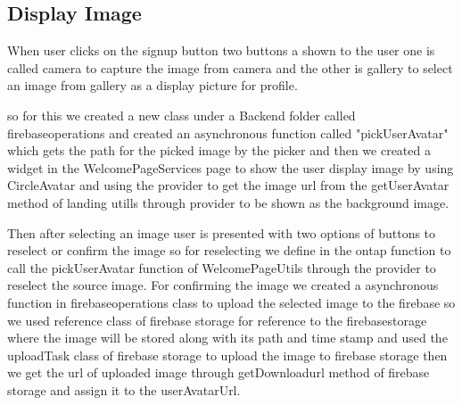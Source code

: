 \subsection{Display Image}
When user clicks on the signup button two buttons a shown to the user one is called camera to capture the image from camera and the other is gallery to select an image from gallery as a display picture for profile.

so for this we created a new class under a Backend folder called firebaseoperations and created an asynchronous function called "pickUserAvatar" which gets the path for the picked image by the picker and then we created a widget in the WelcomePageServices page to show the user display image by using CircleAvatar and using the provider to get the image url from the getUserAvatar method of landing utills through provider to be shown as the background image.

Then after selecting an image user is presented with two options of buttons to reselect or confirm the image so for reselecting we define in the ontap function to call the pickUserAvatar function of WelcomePageUtils through the provider to reselect the source image. For confirming the image we created a asynchronous function in firebaseoperations class to upload the selected image to the firebase so we used reference class of firebase storage for reference to the firebasestorage where the image will be stored along with its path and time stamp and used the uploadTask class of firebase storage to upload the image to firebase storage then we get the url of uploaded image through getDownloadurl method of firebase storage and assign it to the userAvatarUrl.

